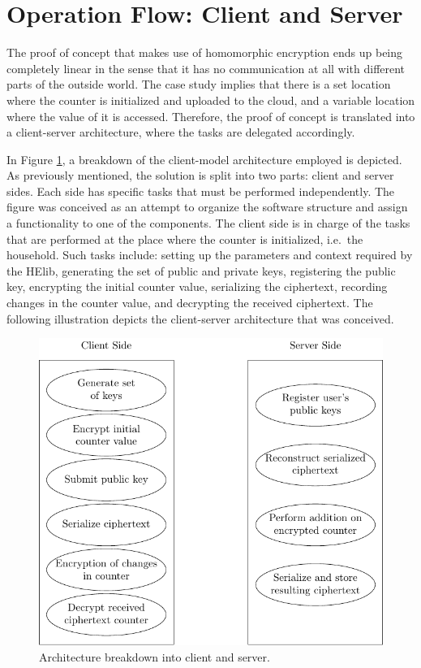 \section{{Operation Flow: Client and Server}}

The proof of concept that makes use of homomorphic encryption ends up being completely linear in the sense that it has no communication at all with different parts of the outside world. The case study implies that there is a set location where the counter is initialized and uploaded to the cloud, and a variable location where the value of it is accessed. Therefore, the proof of concept is translated into a client-server architecture, where the tasks are delegated accordingly. 

In Figure \ref{fig:clientserver}, a breakdown of the client-model architecture employed is depicted. As previously mentioned, the solution is split into two parts: client and server sides. Each side has specific tasks that must be performed independently. The figure was conceived as an attempt to organize the software structure and assign a functionality to one of the components. The client side is in charge of the tasks that are performed at the place where the counter is initialized, i.e.\ the household. Such tasks include: setting up the parameters and context required by the HElib, generating the set of public and private keys, registering the public key, encrypting the initial counter value, serializing the ciphertext, recording changes in the counter value, and decrypting the received ciphertext. The following illustration depicts the client-server architecture that was conceived. 

\begin{figure}[H]
  \centering
  \includegraphics[scale=1]{img/architecture}
 \caption{Architecture breakdown into client and server.}
 \label{fig:clientserver}
\end{figure}

